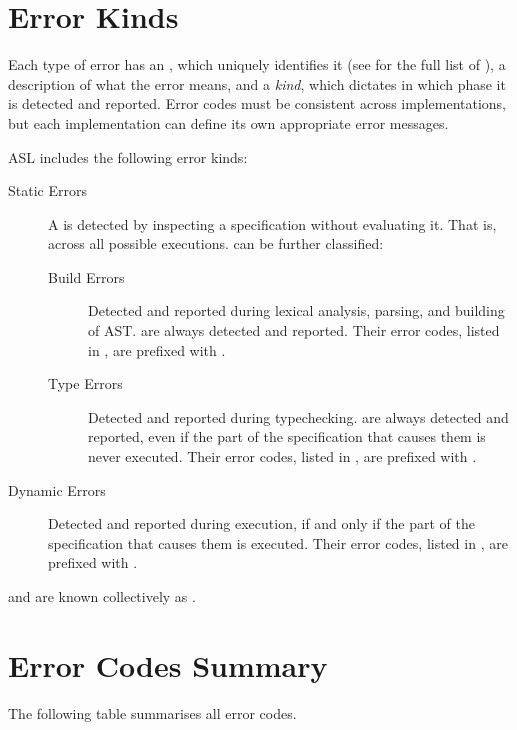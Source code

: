 \section{Error Kinds}
\hypertarget{def-errorcodeterm}{}
Each type of error has an \emph{\errorcodeterm}, which uniquely identifies it
(see  for the full list of \errorcodesterm),
a description of what the error means,
and a \emph{kind}, which dictates in which phase it is detected and reported.
Error codes must be consistent across implementations, but each implementation
can define its own appropriate error messages.

ASL includes the following error kinds:
\begin{description}
  \item[Static Errors] \hypertarget{def-staticerrorterm}{}
  A \emph{\staticerrorterm} is detected by inspecting a specification without evaluating it.
  That is, across all possible executions. \staticerrorsterm{} can be further classified:
  \begin{description}
    \item[Build Errors] \hypertarget{def-builderrorterm}{}
      Detected and reported during lexical analysis, parsing, and building of AST.
      \Builderrorsterm{} are always detected and reported.
      Their error codes, listed in , are prefixed with \BuildErrorPrefix.

    \item[Type Errors] \hypertarget{def-typingerrorterm}{}
      Detected and reported during typechecking.
      \Typingerrorsterm{} are always detected and reported, even if the part of the specification that causes them is never executed.
      Their error codes, listed in , are prefixed with \TypeErrorPrefix.
  \end{description}

  \item[Dynamic Errors] \hypertarget{def-dynamicerrorterm}{}
    Detected and reported during execution, if and only if the part of the specification that causes them is executed.
    Their error codes, listed in , are prefixed with \DynamicErrorPrefix.
\end{description}

\Builderrorsterm{} and \typingerrorsterm{} are known collectively as \staticerrorsterm.

\section{Error Codes Summary\label{sec:ErrorCodesSummary}}
The following table summarises all error codes.

